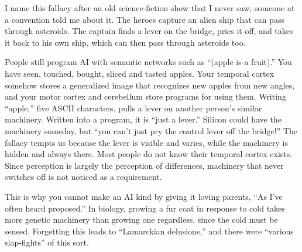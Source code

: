
I name this fallacy after an old science-fiction show that I never saw; someone at a convention told me about it. The heroes capture an alien ship that can pass through asteroids. The captain finds a lever on the bridge, pries it off, and takes it back to his own ship, which can then pass through asteroids too. 

People still program AI with semantic networks such as ``(apple is-a fruit).'' You have seen, touched, bought, sliced and tasted apples. Your temporal cortex somehow stores a generalized image that recognizes new apples from new angles, and your motor cortex and cerebellum store programs for using them. Writing ``apple,'' five ASCII characters, pulls a lever on another person's similar machinery. Written into a program, it is ``just a lever.''  Silicon could have the machinery someday, but ``you can't just pry the control lever off the bridge!'' The fallacy tempts us because the lever is visible and varies, while the machinery is hidden and always there. Most people do not know their temporal cortex exists. Since perception is largely the perception of differences, machinery that never switches off is not noticed as a requirement.

This is why you cannot make an AI kind by giving it loving parents, ``As I've often heard proposed.''  In biology, growing a fur coat in response to cold takes more genetic machinery than growing one regardless, since the cold must be sensed.  Forgetting this leads to ``Lamarckian delusions,'' and there were ``various slap-fights'' of this sort. 

